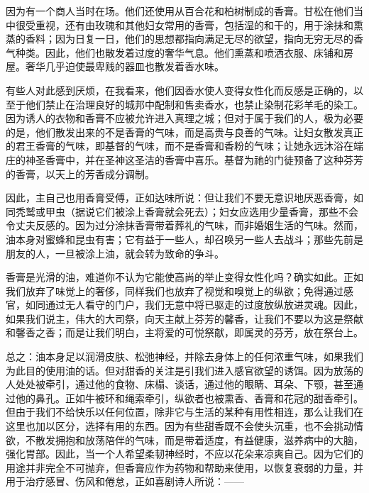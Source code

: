 \par

因为有一个商人当时在场。他们还使用从百合花和柏树制成的香膏。甘松在他们当中很受重视，还有由玫瑰和其他妇女常用的香膏，包括湿的和干的，用于涂抹和熏蒸的香料；因为日复一日，他们的思想都指向满足无尽的欲望，指向无穷无尽的香气种类。因此，他们也散发着过度的奢华气息。他们熏蒸和喷洒衣服、床铺和房屋。奢华几乎迫使最卑贱的器皿也散发着香水味。\par

有些人对此感到厌烦，在我看来，他们因香水使人变得女性化而反感是正确的，以至于他们禁止在治理良好的城邦中配制和售卖香水，也禁止染制花彩羊毛的染工。因为诱人的衣物和香膏不应被允许进入真理之城；但对于属于我们的人，极为必要的是，他们散发出来的不是香膏的气味，而是高贵与良善的气味。让妇女散发真正的君王香膏的气味，即基督的气味，而不是香膏和香粉的气味；让她永远沐浴在端庄的神圣香膏中，并在圣神这圣洁的香膏中喜乐。基督为祂的门徒预备了这种芬芳的香膏，以天上的芳香成分调制。\par

因此，主自己也用香膏受傅，正如达味所说：但让我们不要无意识地厌恶香膏，如同秃鹫或甲虫（据说它们被涂上香膏就会死去）；妇女应选用少量香膏，那些不会令丈夫反感的。因为过分涂抹香膏带着葬礼的气味，而非婚姻生活的气味。然而，油本身对蜜蜂和昆虫有害；它有益于一些人，却召唤另一些人去战斗；那些先前是朋友的人，一旦被涂上油，就会转为致命的争斗。\par

香膏是光滑的油，难道你不认为它能使高尚的举止变得女性化吗？确实如此。正如我们放弃了味觉上的奢侈，同样我们也放弃了视觉和嗅觉上的纵欲；免得通过感官，如同通过无人看守的门户，我们无意中将已驱走的过度放纵放进灵魂。因此，如果我们说主，伟大的大司祭，向天主献上芬芳的馨香，让我们不要以为这是祭献和馨香之香；而是让我们明白，主将爱的可悦祭献，即属灵的芬芳，放在祭台上。\par

总之：油本身足以润滑皮肤、松弛神经，并除去身体上的任何浓重气味，如果我们为此目的使用油的话。但对甜香的关注是引我们进入感官欲望的诱饵。因为放荡的人处处被牵引，通过他的食物、床榻、谈话，通过他的眼睛、耳朵、下颚，甚至通过他的鼻孔。正如牛被环和绳索牵引，纵欲者也被熏香、香膏和花冠的甜香牵引。但由于我们不给快乐以任何位置，除非它与生活的某种有用性相连，那么让我们在这里也加以区分，选择有用的东西。因为有些甜香既不会使头沉重，也不会挑动情欲，不散发拥抱和放荡陪伴的气味，而是带着适度，有益健康，滋养病中的大脑，强化胃部。因此，当一个人希望柔韧神经时，不应以花朵来凉爽自己。因为它们的用途并非完全不可抛弃，但香膏应作为药物和帮助来使用，以恢复衰弱的力量，并用于治疗感冒、伤风和倦怠，正如喜剧诗人所说：——\par

